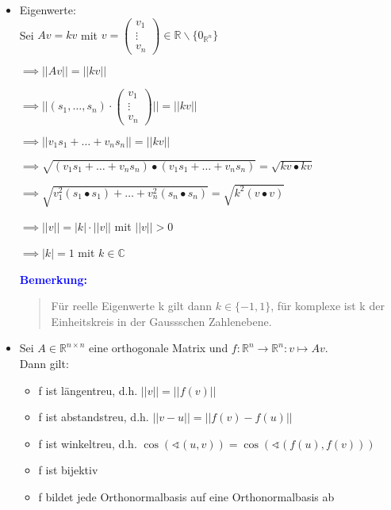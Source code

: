 \documentclass{article}
\newcommand{\blue}[1]{\textcolor{blue}{#1}}
\newcommand{\an}[1]{\blue{\textbf{Bemerkung: }}\begin{quote}#1\end{quote}}
\newcommand{\R}{\mathbb{R}}
\newcommand{\C}{\mathbb{C}}
\newcommand{\no}[1]{||#1||}
\newcommand{\vvvec}[3]{\begin{pmatrix}#1\\#2\\#3\end{pmatrix}}
\newcommand{\bs}{\backslash}
\begin{document}
\newpage
\begin{itemize}
    \item Eigenwerte:\\
    Sei $Av = kv$ mit $v = \vvvec{v_1}{\vdots}{v_n} \in \R \bs \{0_{\R^n}\}$

    $\implies \no{Av} = \no{kv}$

    $\implies \no{(s_1, \dots, s_n) \cdot \vvvec{v_1}{\vdots}{v_n}} = \no{kv}$

    $\implies \no{v_1s_1 + \dots + v_ns_n} = \no{kv}$

    $\implies \sqrt{(v_1s_1 + \dots + v_ns_n) \bullet (v_1s_1 + \dots + v_ns_n)} = \sqrt{kv \bullet kv}$

    $\implies \sqrt{v_1^2(s_1 \bullet s_1) + \dots + v_n^2(s_n \bullet s_n)} = \sqrt{k^2(v \bullet v)}$

    $\implies \no{v} = |k| \cdot \no{v}$ mit $\no{v} > 0$

    $\implies |k| = 1$ mit $k \in \C$

    \an{
        Für reelle Eigenwerte k gilt dann $k \in \{-1,1\}$, für komplexe ist k der Einheitskreis in der Gaussschen Zahlenebene.
    }
    \item Sei $A \in \R^{n \times n}$ eine orthogonale Matrix und $f: \R^n \to \R^n: v \mapsto Av$.\\
    Dann gilt:
    \begin{itemize}
        \item f ist längentreu, d.h. $\no{v} = \no{f(v)}$
        \item f ist abstandstreu, d.h. $\no{v-u} = \no{f(v) - f(u)}$
        \item f ist winkeltreu, d.h. $\cos(\sphericalangle(u,v)) = \cos(\sphericalangle(f(u),f(v)))$
        \item f ist bijektiv
        \item f bildet jede Orthonormalbasis auf eine Orthonormalbasis ab
    \end{itemize}
\end{itemize}
\end{document}
